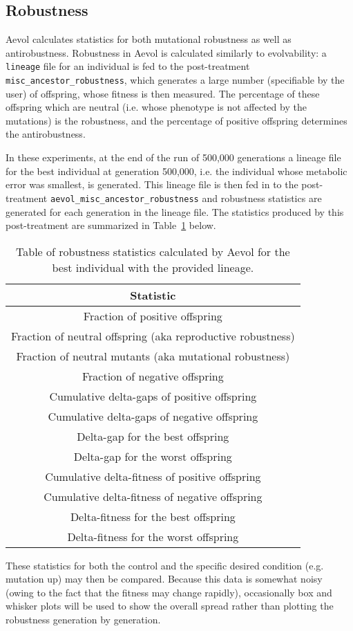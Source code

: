 \subsection{Robustness}
Aevol calculates statistics for both mutational robustness as well as antirobustness. Robustness in Aevol is calculated similarly to evolvability: a \texttt{lineage} file for an individual is fed to the post-treatment \texttt{misc\_ancestor\_robustness}, which generates a large number (specifiable by the user) of offspring, whose fitness is then measured. The percentage of these offspring which are neutral (i.e. whose phenotype is not affected by the mutations) is the robustness, and the percentage of positive offspring determines the antirobustness.

In these experiments, at the end of the run of 500,000 generations a lineage file for the best individual at generation 500,000, i.e. the individual whose metabolic error was smallest, is generated. This lineage file is then fed in to the post-treatment \texttt{aevol\_misc\_ancestor\_robustness} and robustness statistics are generated for each generation in the lineage file. The statistics produced by this post-treatment are summarized in Table~\ref{table:robustness} below.
\begin{table}[H]
	\centering
	\begin{tabular}{||c||}
		\hline
		\textbf{Statistic} \\
		\hline \hline
		Fraction of positive offspring \\
		\hline
		Fraction of neutral offspring (aka reproductive robustness) \\
		\hline
		Fraction of neutral mutants (aka mutational robustness) \\
		\hline
		Fraction of negative offspring \\
		\hline
		Cumulative delta-gaps of positive offspring \\
		\hline
		Cumulative delta-gaps of negative offspring \\
		\hline
		Delta-gap for the best offspring \\
		\hline
		Delta-gap for the worst offspring \\
		\hline
		Cumulative delta-fitness of positive offspring \\
		\hline
		Cumulative delta-fitness of negative offspring \\
		\hline
		Delta-fitness for the best offspring \\
		\hline
		Delta-fitness for the worst offspring \\
		\hline
		
	\end{tabular}
	\caption[Aevol robustness statistics]{Table of robustness statistics calculated by Aevol for the best individual with the provided lineage.}
	\label{table:robustness}
\end{table}
These statistics for both the control and the specific desired condition (e.g. mutation up) may then be compared. Because this data is somewhat noisy (owing to the fact that the fitness may change rapidly), occasionally box and whisker plots will be used to show the overall spread rather than plotting the robustness generation by generation. 
